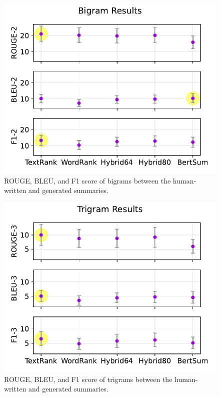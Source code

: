 \documentclass[11pt]{article}
\begin{document}
\begin{figure}[!h]
\centering
\includegraphics[scale = 0.5]{../figures/bigrams.pdf}
\caption{ROUGE, BLEU, and F1 score of bigrams between the human-written and generated summaries.\label{fig:bi}}
\end{figure}

\begin{figure}[!h]
\centering
\includegraphics[scale = 0.5]{../figures/trigrams.pdf}
\caption{ROUGE, BLEU, and F1 score of trigrams between the human-written and generated summaries.\label{fig:tri}}
\end{figure}
\end{document}

